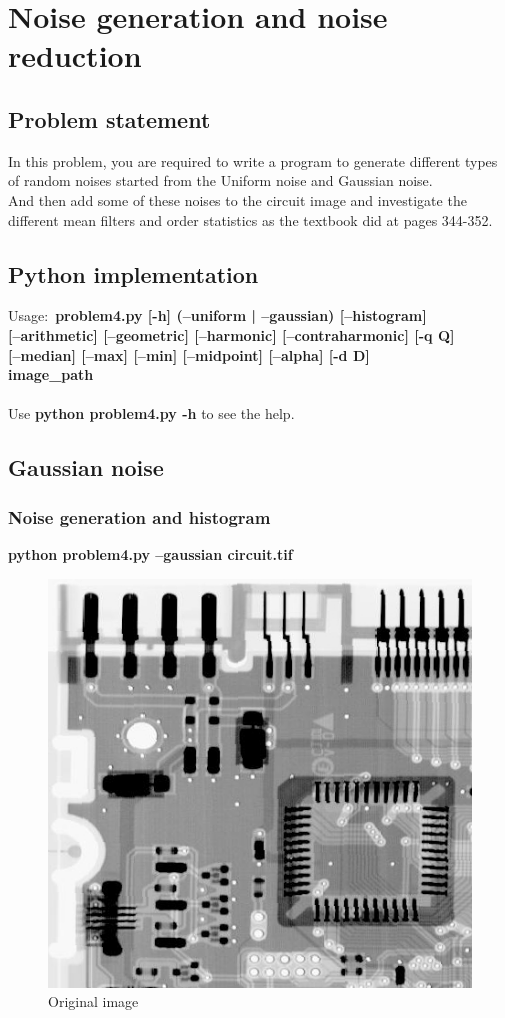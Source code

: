 \chapter{Noise generation and noise reduction}

\section{Problem statement}

In this problem, you are required to write a program to generate different types
of random noises started from the Uniform noise and Gaussian noise. \\
And then add some of these noises to the circuit image and investigate the different
mean filters and order statistics as the textbook did at pages 344-352.

\section{Python implementation}

Usage:~\textbf{problem4.py [-h] (--uniform | --gaussian) [--histogram] \\}
\textbf{[--arithmetic] [--geometric] [--harmonic] [--contraharmonic] [-q Q]} \\
\textbf{[--median] [--max] [--min] [--midpoint] [--alpha] [-d D]} \\
\textbf{image\_path} \\\\
Use \textbf{python problem4.py -h} to see the help.

\pagebreak
\section{Gaussian noise}

\subsection{Noise generation and histogram}

\textbf{python problem4.py --gaussian circuit.tif}

\begin{figure}[!htb]\centering
    \includegraphics[width=0.6\linewidth]{./images/4/original.jpg}
    \caption{\small{Original image}}
\end{figure}

